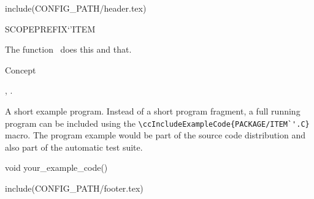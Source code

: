 include(CONFIG_PATH/header.tex)
\begin{ccRefFunction}SCOPE{PREFIX`'ITEM}  %


\ccDefinition
  
The function \ccRefName\ does this and that.



\ccIsModel

Concept

\ccSeeAlso

,
.

\ccExample

A short example program.
Instead of a short program fragment, a full running program can be
included using the 
\verb|\ccIncludeExampleCode{PACKAGE/ITEM`'.C}| 
macro. The program example would be part of the source code distribution and
also part of the automatic test suite.

\begin{ccExampleCode}
void your_example_code() {
}
\end{ccExampleCode}


\end{ccRefFunction}

include(CONFIG_PATH/footer.tex)
